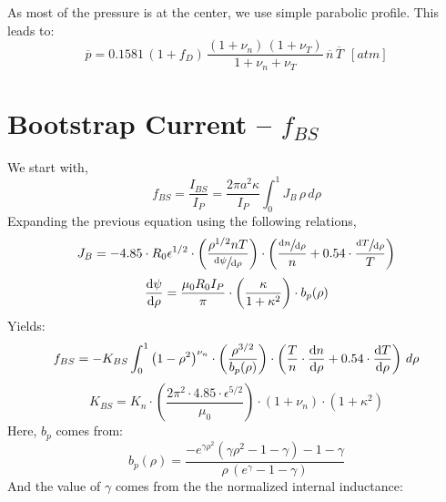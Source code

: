 As most of the pressure is at the center, we use simple parabolic profile. This leads to:
\begin{equation}
	\overline{p} = 0.1581 \, ( 1 + f_D ) \, \frac{ (1 + \nu_n) \, (1 + \nu_T) }{1 + \nu_n + \nu_T } \, \overline{n} \, \overline{T} \ \ [atm]
\end{equation}

\section{Bootstrap Current -- $f_{BS}$}

\label{section:pedestalbootstrap}

We start with,
\begin{equation}
	f_{BS} = \frac{I_{BS}}{I_P} = \frac{ 2 \pi a^2 \kappa }{I_P} \int_0^1 J_B \, \rho \, d\rho
\end{equation}
Expanding the previous equation using the following relations,
\begin{equation}
	J_B = -4.85 \cdot R_0 \epsilon^{1/2} \cdot \left( \frac{ \rho^{1/2} n T }{ \sfrac{ \textnormal{d}\psi }{ \textnormal{d}\rho } } \right) \cdot \left( \frac{ \sfrac{ \textnormal{d}n }{ \textnormal{d}\rho } }{ n } + 0.54 \cdot \frac{ \sfrac{ \textnormal{d}T }{ \textnormal{d}\rho } }{ T } \right)
\end{equation}
\begin{equation}
	\frac{ \textnormal{d}\psi }{ \textnormal{d}\rho } = \frac{ \mu_0 R_0 I_P }{ \pi } \cdot \left( \frac{ \kappa}{1+\kappa^2} \right) \cdot b_p(\rho)
\end{equation}
Yields:
\begin{equation}
	f_{BS} = -K_{BS} \int_0^1 \left( 1 - \rho^2  \right)^{\nu_n} \cdot \left( \frac{ \rho^{3/2} }{ b_p(\rho) } \right) \cdot \left( \frac{T}{ n } \cdot  \frac{ \textnormal{d}n }{ \textnormal{d}\rho } + 0.54 \cdot  \frac{ \textnormal{d}T }{ \textnormal{d}\rho }  \right)
 \, d\rho
\end{equation}
\begin{equation}
	K_{BS} = K_n \cdot \left( \frac{ 2 \pi^2 \cdot 4.85 \cdot \epsilon^{5/2} }{\mu_0} \right) \cdot ( 1 + \nu_n ) \cdot ( 1 + \kappa^2 )
\end{equation}
Here, $b_p$ comes from:
\begin{equation}
	b_p(\rho) = \frac{ -e^{\gamma\rho^2} ( \gamma\rho^2 - 1 - \gamma ) - 1 - \gamma }{\rho \,( e^\gamma - 1 - \gamma ) }
\end{equation}
And the value of $\gamma$ comes from the the normalized internal inductance:

